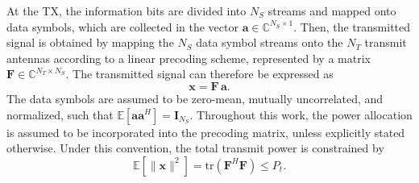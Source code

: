 At the \ac{TX}, the information bits are divided into $N_S$ streams and mapped onto data symbols, which are collected in the vector $\mathbf{a} \in \mathbb{C}^{N_S \times 1}$.
Then, the transmitted signal is obtained by mapping the $N_S$ data symbol streams onto the $N_T$ transmit antennas according to a linear precoding scheme, represented by a matrix $\mathbf{F} \in \mathbb{C}^{N_T \times N_S}$.
The transmitted signal can therefore be expressed as
\begin{equation}
    \mathbf{x} = \mathbf{F} \, \mathbf{a}.
\label{eq:su_mimo_precoding}
\end{equation}
The data symbols are assumed to be zero-mean, mutually uncorrelated, and normalized, such that $ \mathbb{E}\!\left[\mathbf{a}\mathbf{a}^H\right] = \mathbf{I}_{N_S} $.
Throughout this work, the power allocation is assumed to be incorporated into the precoding matrix, unless explicitly stated otherwise. Under this convention, the total transmit power is constrained by
\begin{equation}
    \mathbb{E}\!\left[\|\mathbf{x}\|^2\right] = \mathrm{tr}\!\left(\mathbf{F}^H \mathbf{F}\right) \leq P_t.
\label{eq:Pt_constraint_su}
\end{equation}

